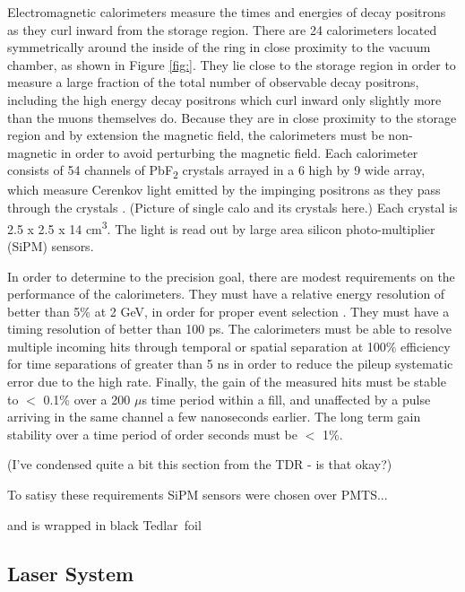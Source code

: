 Electromagnetic calorimeters measure the times and energies of decay positrons as they curl inward from the storage region. There are 24 calorimeters located symmetrically around the inside of the ring in close proximity to the vacuum chamber, as shown in Figure \ref{fig:}. They lie close to the storage region in order to measure a large fraction of the total number of observable decay positrons, including the high energy decay positrons which curl inward only slightly more than the muons themselves do. Because they are in close proximity to the storage region and by extension the magnetic field, the calorimeters must be non-magnetic in order to avoid perturbing the magnetic field. Each calorimeter consists of 54 channels of PbF\textsubscript{2} crystals arrayed in a 6 high by 9 wide array, which measure Cerenkov light emitted by the impinging positrons as they pass through the crystals \cite{Fienberg:2014kka}. (Picture of single calo and its crystals here.) Each crystal is 2.5 x 2.5 x 14 cm\textsuperscript{3}. The light is read out by large area silicon photo-multiplier (SiPM) sensors.


In order to determine \amu to the precision goal, there are modest requirements on the performance of the calorimeters. They must have a relative energy resolution of better than 5\% at 2 GeV, in order for proper event selection \cite{TDR}. They must have a timing resolution of better than 100 ps. The calorimeters must be able to resolve multiple incoming hits through temporal or spatial separation at 100\% efficiency for time separations of greater than 5 ns in order to reduce the pileup systematic error due to the high rate. Finally, the gain of the measured hits must be stable to $<$ 0.1\% over a 200 $\mu$s time period within a fill, and unaffected by a pulse arriving in the same channel a few nanoseconds earlier. The long term gain stability over a time period of order seconds must be $<$ 1\%.

(I've condensed quite a bit this section from the TDR - is that okay?)


To satisy these requirements SiPM sensors were chosen over PMTS...



and is wrapped in black Tedlar\textregistered\ foil



\subsection{Laser System}
\label{LaserSystem}


